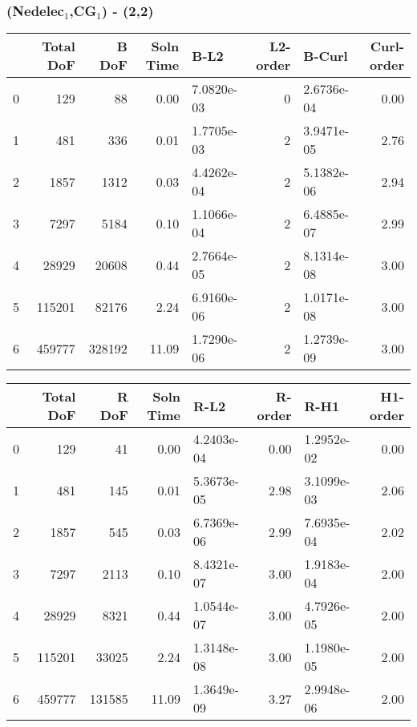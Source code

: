 \documentclass[12pt]{extarticle}
\numberwithin{equation}{section}    %
\begin{document}
\subsubsection*{(Nedelec$_1$,CG$_1$) - (2,2)}
\begin{tabular}{lrrrlrlr}
\hline
{} &  Total DoF &   B DoF &  Soln Time &        B-L2 &  L2-order &      B-Curl &  Curl-order \\
\hline
0 &        129 &      88 &       0.00 &  7.0820e-03 &        0 &  2.6736e-04 &        0.00 \\
1 &        481 &     336 &       0.01 &  1.7705e-03 &        2 &  3.9471e-05 &        2.76 \\
2 &       1857 &    1312 &       0.03 &  4.4262e-04 &        2 &  5.1382e-06 &        2.94 \\
3 &       7297 &    5184 &       0.10 &  1.1066e-04 &        2 &  6.4885e-07 &        2.99 \\
4 &      28929 &   20608 &       0.44 &  2.7664e-05 &        2 &  8.1314e-08 &        3.00 \\
5 &     115201 &   82176 &       2.24 &  6.9160e-06 &        2 &  1.0171e-08 &        3.00 \\
6 &     459777 &  328192 &      11.09 &  1.7290e-06 &        2 &  1.2739e-09 &        3.00 \\
\hline
\end{tabular}

\begin{tabular}{lrrrlrlr}
\hline
{} &  Total DoF &   R DoF &  Soln Time &        R-L2 &  R-order &        R-H1 &  H1-order \\
\hline
0 &        129 &      41 &       0.00 &  4.2403e-04 &     0.00 &  1.2952e-02 &      0.00 \\
1 &        481 &     145 &       0.01 &  5.3673e-05 &     2.98 &  3.1099e-03 &      2.06 \\
2 &       1857 &     545 &       0.03 &  6.7369e-06 &     2.99 &  7.6935e-04 &      2.02 \\
3 &       7297 &    2113 &       0.10 &  8.4321e-07 &     3.00 &  1.9183e-04 &      2.00 \\
4 &      28929 &    8321 &       0.44 &  1.0544e-07 &     3.00 &  4.7926e-05 &      2.00 \\
5 &     115201 &   33025 &       2.24 &  1.3148e-08 &     3.00 &  1.1980e-05 &      2.00 \\
6 &     459777 &  131585 &      11.09 &  1.3649e-09 &     3.27 &  2.9948e-06 &      2.00 \\
\hline
\end{tabular}
\end{document}
